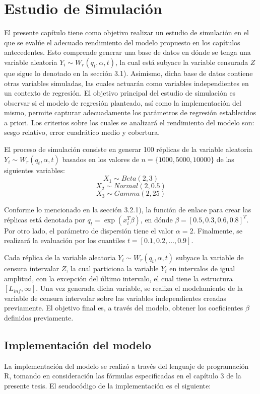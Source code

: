 \chapter{Estudio de Simulación}
El presente capítulo tiene como objetivo realizar un estudio de simulación en el que se evalúe el adecuado rendimiento del modelo propuesto en los capítulos antecedentes. Esto comprende generar una base de datos en dónde se tenga una variable aleatoria $Y_i \sim W_r(q_t, \alpha,t)$, la cual está subyace la variable censurada $Z$ que sigue lo denotado en la sección 3.1). Asimismo, dicha base de datos contiene otras variables simuladas, las cuales actuarán como variables independientes en un contexto de regresión. El objetivo principal del estudio de simulación es observar si el modelo de regresión planteado, así como la implementación del mismo, permite capturar adecuadamente los parámetros de regresión establecidos a priori. Los criterios sobre los cuales se analizará el rendimiento del modelo son: sesgo relativo, error cuadrático medio y cobertura.

El proceso de simulación consiste en generar 100 réplicas de la variable aleatoria $Y_i \sim W_r(q_t, \alpha,t)$ basados en los valores de $n=\{1000, 5000, 10000\}$ de las siguientes variables:
\[X_{1} \sim Beta(2,3)\]
\[X_{2} \sim Normal(2,0.5)\]
\[X_{3} \sim Gamma(2,25)\]

Conforme lo mencionado en la sección 3.2.1), la función de enlace para crear las réplicas está denotada por $q_t =  \exp(x_i^T \beta)$, en dónde $\beta =[0.5, 0.3, 0.6, 0.8]^T$. Por otro lado, el parámetro de dispersión tiene el valor $\alpha = 2$. Finalmente, se realizará la evaluación por los cuantiles $t = [0.1, 0.2, \dots, 0.9]$.

Cada réplica de la variable aleatoria $Y_i \sim W_r(q_t, \alpha,t)$ subyace la variable de censura intervalar $Z$, la cual particiona la variable $Y_i$ en intervalos de igual amplitud, con la excepción del último intervalo, el cual tiene la estructura $[L_{inf}, \infty]$. Una vez generada dicha variable, se realiza el modelamiento de la variable de censura intervalar sobre las variables independientes creadas previamente. El objetivo final es, a través del modelo, obtener los coeficientes $\beta$ definidos previamente.

\section{Implementación del modelo}

La implementación del modelo se realizó a través del lenguaje de programación R, tomando en consideración las fórmulas especificadas en el capítulo 3 de la presente tesis. El seudocódigo de la implementación es el siguiente:

